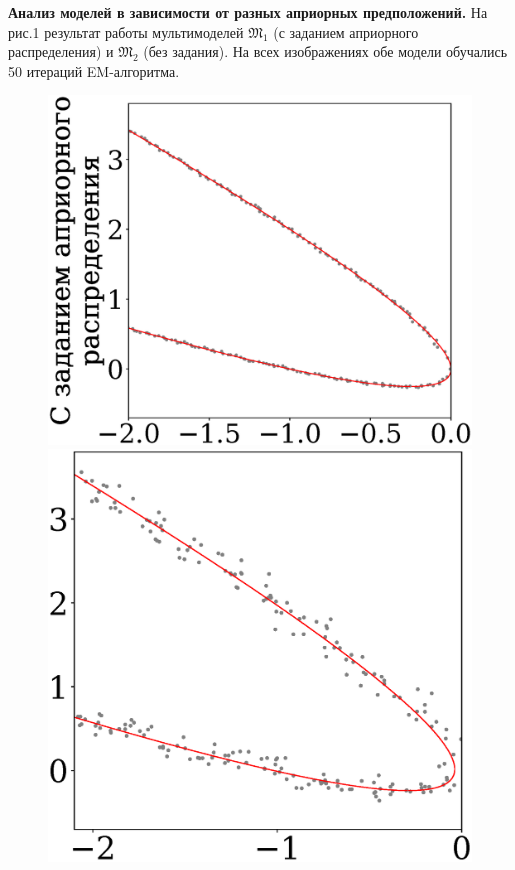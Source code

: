 \documentclass[12pt,twoside]{article}
\begin{document}
\textbf{Анализ моделей в зависимости от разных априорных предположений.} На рис.1 результат работы мультимоделей $\mathfrak{M}_1$ (с заданием априорного распределения) и $\mathfrak{M}_2$ (без задания). На всех изображениях обе модели обучались 50 итераций EM-алгоритма. \\
\begin{figure}
\begin{minipage}{.49\textwidth}
 \centering
      \includegraphics[scale = 0.4]{510.eps}
\end{minipage}
\begin{minipage}{.49\textwidth}
  \centering
  \vspace{1mm}
    \includegraphics[scale = 0.4]{511.eps}

\end{minipage}
\end{figure}
\end{document}
